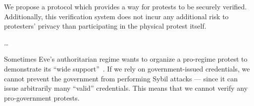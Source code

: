 We propose a protocol which provides a way for protests to be securely verified.
Additionally, this verification system does not incur any additional risk to 
protesters' privacy than participating in the physical protest itself.

\dots

Sometimes Eve's authoritarian regime wants to organize a pro-regime protest to 
demonstrate its \enquote{wide 
  support}~\cite[e.g.][]{AlJazeeraOnVenezuela2017,VenezuelanStateWorkersCalledToParticipate}.
If we rely on government-issued credentials, we cannot prevent the government 
from performing Sybil attacks --- since it can issue arbitrarily many 
\enquote{valid} credentials.
This means that we cannot verify any pro-government protests.


